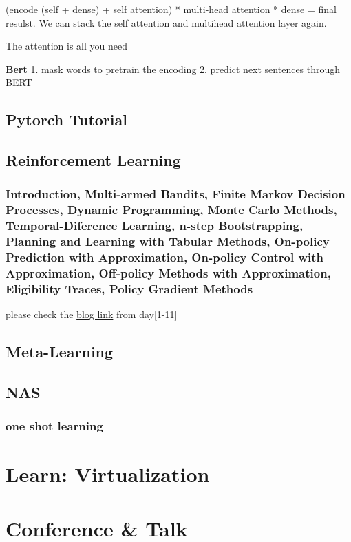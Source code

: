 \documentclass[8pt,UTF8]{article}
\begin{document}
            (encode (self + dense) + self attention) * multi-head attention * dense = final resulst. We can stack the self attention and multihead attention layer again.
            
            The attention is all you need~\cite{vaswani2017attention}
            
            \textbf{Bert}
            1. mask words to pretrain the encoding 2. predict next sentences through BERT
    
    \subsection{Pytorch Tutorial}
    
    \subsection{Reinforcement Learning}
        \subsubsection{Introduction, Multi-armed Bandits, Finite Markov Decision Processes, Dynamic Programming, Monte Carlo Methods, Temporal-Diference Learning, n-step Bootstrapping, Planning and Learning with Tabular     Methods, On-policy Prediction with Approximation, On-policy Control with Approximation, Off-policy Methods with Approximation, Eligibility Traces, Policy Gradient Methods}
            please check the \href{https://zzz0906.github.io/tags/ReinforcementLearning/}{blog link} from day[1-11]
        
    \subsection{Meta-Learning}
    
    \subsection{NAS}
        \subsubsection{one shot learning}

\section{Learn: Virtualization}

\section{Conference \& Talk}
\end{document}
